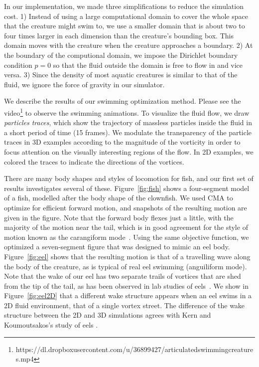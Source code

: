In our implementation, we made three simplifications to reduce the
simulation cost. 1) Instead of using a large computational domain to cover
the whole space that the creature might swim to, we use a smaller domain
that is about two to four times larger in each dimension than the
creature's bounding box. This domain moves with the creature when the
creature approaches a boundary. 2) At the boundary of the computional
domain, we impose the Dirichlet boundary condition $p=0$ so that the fluid
outside the domain is free to flow in and vice versa. 3) Since the density
of most aquatic creatures is similar to that of the fluid, we ignore the force of gravity in our simulator.

We describe the results of our swimming optimization method.  Please see the video\footnote{https://dl.dropboxusercontent.com/u/36899427/articulatedswimmingcreatures.mp4} to observe the swimming
animations.  To visualize the fluid flow, we draw \emph{particles traces},
which show the trajectory of massless particles inside the fluid in a
short period of time (15 frames). We modulate the transparency of the
particle traces in 3D examples according to the magnitude of the vorticity
in order to focus attention on the visually interesting regions of the
flow.  In 2D examples, we colored the traces to indicate the directions of
the vortices.


There are many body shapes and styles of locomotion for fish, and our
first set of results investigates several of these.  Figure~\ref{fig:fish}
shows a four-segment model of a fish, modelled after the body shape of the
clownfish.  We used CMA to optimize for efficient forward motion, and snapshots of the resulting motion are given in the figure.  Note that the
forward body flexes just a little, with the majority of the motion near
the tail, which is in good agreement for the style of motion known as the
carangiform mode~\cite{lindsey1978form}.  Using the same objective
function, we optimized a seven-segment figure that was designed to mimic
an eel body.  Figure~\ref{fig:eel} shows that the resulting motion is that
of a travelling wave along the body of the creature, as is typical of real
eel swimming (anguiliform mode).  Note that the wake of our eel has two
separate trails of vortices that are shed from the tip of the tail, as has
been observed in lab studies of eels~\cite{tytell2004hydrodynamics}. We show in Figure~\ref{fig:eel2D} that a different wake structure appears when an eel swims in a 2D fluid environment, that of a single vortex street. The difference of the wake structure between the 2D and 3D simulations agrees with Kern and Koumoutsakos's study of eels \cite{kern2006simulations}.

